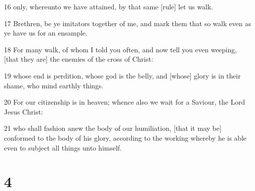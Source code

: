 \par 16 only, whereunto we have attained, by that same [rule] let us walk.
\par 17 Brethren, be ye imitators together of me, and mark them that so walk even as ye have us for an ensample.
\par 18 For many walk, of whom I told you often, and now tell you even weeping, [that they are] the enemies of the cross of Christ:
\par 19 whose end is perdition, whose god is the belly, and [whose] glory is in their shame, who mind earthly things.
\par 20 For our citizenship is in heaven; whence also we wait for a Saviour, the Lord Jesus Christ:
\par 21 who shall fashion anew the body of our humiliation, [that it may be] conformed to the body of his glory, according to the working whereby he is able even to subject all things unto himself.

\chapter{4}

